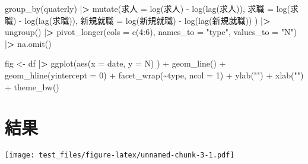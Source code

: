 \documentclass[
]{book}
\newenvironment{Shaded}{\begin{snugshade}}{\end{snugshade}}
\newcommand{\AttributeTok}[1]{\textcolor[rgb]{0.77,0.63,0.00}{#1}}
\newcommand{\DecValTok}[1]{\textcolor[rgb]{0.00,0.00,0.81}{#1}}
\newcommand{\ErrorTok}[1]{\textcolor[rgb]{0.64,0.00,0.00}{\textbf{#1}}}
\newcommand{\FunctionTok}[1]{\textcolor[rgb]{0.00,0.00,0.00}{#1}}
\newcommand{\NormalTok}[1]{#1}
\newcommand{\OtherTok}[1]{\textcolor[rgb]{0.56,0.35,0.01}{#1}}
\newcommand{\SpecialCharTok}[1]{\textcolor[rgb]{0.00,0.00,0.00}{#1}}
\newcommand{\StringTok}[1]{\textcolor[rgb]{0.31,0.60,0.02}{#1}}
\begin{document}
\begin{Shaded}
\begin{Highlighting}[]
  \FunctionTok{group\_by}\NormalTok{(quaterly) }\SpecialCharTok{|}\ErrorTok{\textgreater{}} 
  \FunctionTok{mutate}\NormalTok{(求人 }\OtherTok{=} \FunctionTok{log}\NormalTok{(求人) }\SpecialCharTok{{-}} \FunctionTok{log}\NormalTok{(}\FunctionTok{lag}\NormalTok{(求人)),}
\NormalTok{           求職 }\OtherTok{=} \FunctionTok{log}\NormalTok{(求職) }\SpecialCharTok{{-}} \FunctionTok{log}\NormalTok{(}\FunctionTok{lag}\NormalTok{(求職)),}
\NormalTok{           新規就職 }\OtherTok{=} \FunctionTok{log}\NormalTok{(新規就職) }\SpecialCharTok{{-}} \FunctionTok{log}\NormalTok{(}\FunctionTok{lag}\NormalTok{(新規就職))}
\NormalTok{           ) }\SpecialCharTok{|}\ErrorTok{\textgreater{}} 
  \FunctionTok{ungroup}\NormalTok{() }\SpecialCharTok{|}\ErrorTok{\textgreater{}} 
  \FunctionTok{pivot\_longer}\NormalTok{(}\AttributeTok{cols =} \FunctionTok{c}\NormalTok{(}\DecValTok{4}\SpecialCharTok{:}\DecValTok{6}\NormalTok{),}
               \AttributeTok{names\_to =} \StringTok{"type"}\NormalTok{,}
               \AttributeTok{values\_to =} \StringTok{"N"}\NormalTok{) }\SpecialCharTok{|}\ErrorTok{\textgreater{}} 
  \FunctionTok{na.omit}\NormalTok{()}

\NormalTok{fig }\OtherTok{\textless{}{-}}
\NormalTok{  df }\SpecialCharTok{|}\ErrorTok{\textgreater{}} 
  \FunctionTok{ggplot}\NormalTok{(}\FunctionTok{aes}\NormalTok{(}\AttributeTok{x =}\NormalTok{ date,}
             \AttributeTok{y =}\NormalTok{ N)}
\NormalTok{         ) }\SpecialCharTok{+}
  \FunctionTok{geom\_line}\NormalTok{() }\SpecialCharTok{+}
  \FunctionTok{geom\_hline}\NormalTok{(}\AttributeTok{yintercept =} \DecValTok{0}\NormalTok{) }\SpecialCharTok{+}
  \FunctionTok{facet\_wrap}\NormalTok{(}\SpecialCharTok{\textasciitilde{}}\NormalTok{type,}
             \AttributeTok{ncol =} \DecValTok{1}\NormalTok{) }\SpecialCharTok{+}
  \FunctionTok{ylab}\NormalTok{(}\StringTok{""}\NormalTok{) }\SpecialCharTok{+}
  \FunctionTok{xlab}\NormalTok{(}\StringTok{""}\NormalTok{) }\SpecialCharTok{+}
  \FunctionTok{theme\_bw}\NormalTok{()}
\end{Highlighting}
\end{Shaded}

\hypertarget{ux7d50ux679c}{%
\section{結果}\label{ux7d50ux679c}}

\texttt{[image: test\_files/figure-latex/unnamed-chunk-3-1.pdf]}
\end{document}
